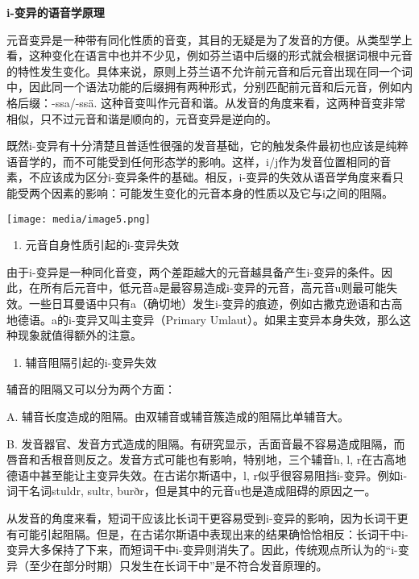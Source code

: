 \textbf{i-变异的语音学原理}

元音变异是一种带有同化性质的音变，其目的无疑是为了发音的方便。从类型学上看，这种变化在语言中也并不少见，例如芬兰语中后缀的形式就会根据词根中元音的特性发生变化。具体来说，原则上芬兰语不允许前元音和后元音出现在同一个词中，因此同一个语法功能的后缀拥有两种形式，分别匹配前元音和后元音，例如内格后缀：-ssa/-ssä.
这种音变叫作元音和谐。从发音的角度来看，这两种音变非常相似，只不过元音和谐是顺向的，元音变异是逆向的。

既然i-变异有十分清楚且普适性很强的发音基础，它的触发条件最初也应该是纯粹语音学的，而不可能受到任何形态学的影响。这样，i/j作为发音位置相同的音素，不应该成为区分i-变异条件的基础。相反，i-变异的失效从语音学角度来看只能受两个因素的影响：可能发生变化的元音本身的性质以及它与i之间的阻隔。

\texttt{[image: media/image5.png]}

\begin{enumerate}
  \def\labelenumi{\arabic{enumi})}
  \item
        元音自身性质引起的i-变异失效
\end{enumerate}

由于i-变异是一种同化音变，两个差距越大的元音越具备产生i-变异的条件。因此，在所有后元音中，低元音a是最容易造成i-变异的元音，高元音u则最可能失效。一些日耳曼语中只有a（确切地）发生i-变异的痕迹，例如古撒克逊语和古高地德语。a的i-变异又叫主变异（Primary
Umlaut）。如果主变异本身失效，那么这种现象就值得额外的注意。

\begin{enumerate}
  \def\labelenumi{\arabic{enumi})}
  \setcounter{enumi}{1}
  \item
        辅音阻隔引起的i-变异失效
\end{enumerate}

辅音的阻隔又可以分为两个方面：

A. 辅音长度造成的阻隔。由双辅音或辅音簇造成的阻隔比单辅音大。

B.
发音器官、发音方式造成的阻隔。有研究显示，舌面音最不容易造成阻隔，而唇音和舌根音则反之。发音方式可能也有影响，特别地，三个辅音h,
l, r在古高地德语中甚至能让主变异失效。在古诺尔斯语中，l,
r似乎很容易阻挡i-变异。例如i-词干名词stuldr, sultr,
burðr，但是其中的元音u也是造成阻碍的原因之一。

从发音的角度来看，短词干应该比长词干更容易受到i-变异的影响，因为长词干更有可能引起阻隔。但是，在古诺尔斯语中表现出来的结果确恰恰相反：长词干中i-变异大多保持了下来，而短词干中i-变异则消失了。因此，传统观点所认为的``i-变异（至少在部分时期）只发生在长词干中''是不符合发音原理的。

